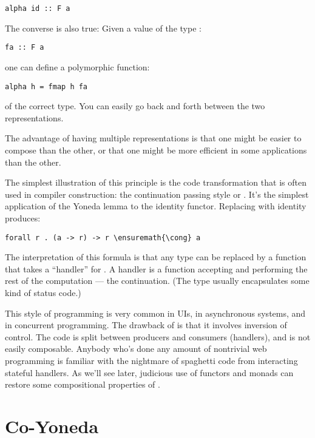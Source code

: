 \begin{Verbatim}[commandchars=\\\{\}]
alpha id :: F a
\end{Verbatim}
The converse is also true: Given a value of the type :

\begin{Verbatim}[commandchars=\\\{\}]
fa :: F a
\end{Verbatim}
one can define a polymorphic function:

\begin{Verbatim}[commandchars=\\\{\}]
alpha h = fmap h fa
\end{Verbatim}
of the correct type. You can easily go back and forth between the two
representations.

The advantage of having multiple representations is that one might be
easier to compose than the other, or that one might be more efficient in
some applications than the other.

The simplest illustration of this principle is the code transformation
that is often used in compiler construction: the continuation passing
style or . It's the simplest application of the Yoneda lemma to the
identity functor. Replacing  with identity produces:

\begin{Verbatim}[commandchars=\\\{\}]
forall r . (a -> r) -> r \ensuremath{\cong} a
\end{Verbatim}
The interpretation of this formula is that any type  can be
replaced by a function that takes a ``handler'' for . A
handler is a function accepting  and performing the rest of
the computation --- the continuation. (The type  usually
encapsulates some kind of status code.)

This style of programming is very common in UIs, in asynchronous
systems, and in concurrent programming. The drawback of  is that it
involves inversion of control. The code is split between producers and
consumers (handlers), and is not easily composable. Anybody who's done
any amount of nontrivial web programming is familiar with the nightmare
of spaghetti code from interacting stateful handlers. As we'll see
later, judicious use of functors and monads can restore some
compositional properties of .

\section{Co-Yoneda}\label{co-yoneda}

